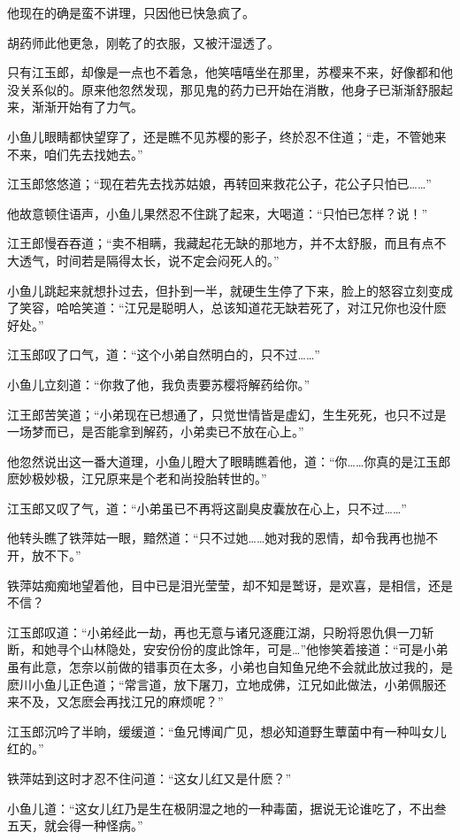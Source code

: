 \documentclass[12pt,oneside]{book}
\begin{document}
他现在的确是蛮不讲理，只因他已快急疯了。

胡药师此他更急，刚乾了的衣服，又被汗湿透了。

只有江玉郎，却像是一点也不着急，他笑嘻嘻坐在那里，苏樱来不来，好像都和他没关系似的。原来他忽然发现，那见鬼的药力已开始在消散，他身子已渐渐舒服起来，渐渐开始有了力气。

小鱼儿眼睛都快望穿了，还是瞧不见苏樱的影子，终於忍不住道；``走，不管她来不来，咱们先去找她去。''

江玉郎悠悠道；``现在若先去找苏姑娘，再转回来救花公子，花公子只怕已\ldots\ldots{}''

他故意顿住语声，小鱼儿果然忍不住跳了起来，大喝道：``只怕已怎样？说！''

江王郎慢吞吞道；``卖不相瞒，我藏起花无缺的那地方，并不太舒服，而且有点不大透气，时间若是隔得太长，说不定会闷死人的。''

小鱼儿跳起来就想扑过去，但扑到一半，就硬生生停了下来，脸上的怒容立刻变成了笑容，哈哈笑道：``江兄是聪明人，总该知道花无缺若死了，对江兄你也没什麽好处。''

江玉郎叹了口气，道：``这个小弟自然明白的，只不过\ldots\ldots{}''

小鱼儿立刻道：``你救了他，我负责要苏樱将解药给你。''

江王郎苦笑道；``小弟现在已想通了，只觉世情皆是虚幻，生生死死，也只不过是一场梦而已，是否能拿到解药，小弟卖已不放在心上。''

他忽然说出这一番大道理，小鱼儿瞪大了眼睛瞧着他，道：``你\ldots\ldots 你真的是江玉郎麽妙极妙极，江兄原来是个老和尚投胎转世的。''

江玉郎又叹了气，道：``小弟虽已不再将这副臭皮囊放在心上，只不过\ldots\ldots{}''

他转头瞧了铁萍姑一眼，黯然道：``只不过她\ldots\ldots 她对我的恩情，却令我再也抛不开，放不下。''

铁萍姑痴痴地望着他，目中已是泪光莹莹，却不知是鹫讶，是欢喜，是相信，还是不信？

江玉郎叹道：``小弟经此一劫，再也无意与诸兄逐鹿江湖，只盼将恩仇俱一刀斩断，和她寻个山林隐处，安安份份的度此馀年，可是\ldots{}''他惨笑着接道：``可是小弟虽有此意，怎奈以前做的错事页在太多，小弟也自知鱼兄绝不会就此放过我的，是麽川小鱼儿正色道；``常言道，放下屠刀，立地成佛，江兄如此做法，小弟佩服还来不及，又怎麽会再找江兄的麻烦呢？''

江玉郎沉吟了半晌，缓缓道：``鱼兄博闻广见，想必知道野生蕈菌中有一种叫女儿红的。''

铁萍姑到这时才忍不住问道：``这女儿红又是什麽？''

小鱼儿道：``这女儿红乃是生在极阴湿之地的一种毒菌，据说无论谁吃了，不出叁五天，就会得一种怪病。''
\end{document}
